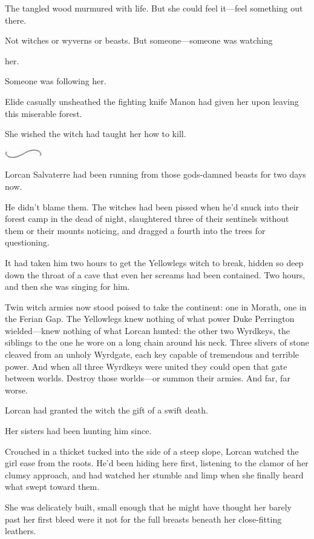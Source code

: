 The tangled wood murmured with life. But she could feel it---feel something out there.

Not witches or wyverns or beasts. But someone---someone was watching

her.

Someone was following her.

Elide casually unsheathed the fighting knife Manon had given her upon leaving this miserable forest.

She wished the witch had taught her how to kill.

\includegraphics[width=0.65in,height=0.13in]{images/seperator}

Lorcan Salvaterre had been running from those gods-damned beasts for two days now.

He didn't blame them. The witches had been pissed when he'd snuck into their forest camp in the dead of night, slaughtered three of their sentinels without them or their mounts noticing, and dragged a fourth into the trees for questioning.

It had taken him two hours to get the Yellowlegs witch to break, hidden so deep down the throat of a cave that even her screams had been contained. Two hours, and then she was singing for him.

Twin witch armies now stood poised to take the continent: one in Morath, one in the Ferian Gap. The Yellowlegs knew nothing of what power Duke Perrington wielded---knew nothing of what Lorcan hunted: the other two Wyrdkeys, the siblings to the one he wore on a long chain around his neck. Three slivers of stone cleaved from an unholy Wyrdgate, each key capable of tremendous and terrible power. And when all three Wyrdkeys were united  they could open that gate between worlds. Destroy those worlds---or summon their armies. And far, far worse.

Lorcan had granted the witch the gift of a swift death.

Her sisters had been hunting him since.

Crouched in a thicket tucked into the side of a steep slope, Lorcan watched the girl ease from the roots. He'd been hiding here first, listening to the clamor of her clumsy approach, and had watched her stumble and limp when she finally heard what swept toward them.

She was delicately built, small enough that he might have thought her barely past her first bleed were it not for the full breasts beneath her close-fitting leathers.


